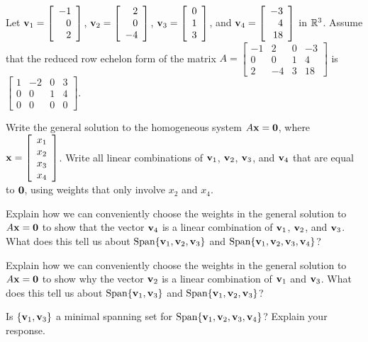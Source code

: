 \begin{activity} \label{act:1_f_4} Let $\mathbf{v}_1 = \left[ \begin{array}{r} -1 \\ 0 \\ 2 \end{array} \right]$, $\mathbf{v}_2 = \left[ \begin{array}{r} 2 \\ 0 \\ -4 \end{array} \right]$, $\mathbf{v}_3 = \left[ \begin{array}{c} 0 \\ 1 \\ 3 \end{array} \right]$, and $\mathbf{v}_4 = \left[ \begin{array}{r} -3 \\ 4 \\ 18 \end{array} \right]$ in $\mathbb{R}^3$. Assume that the reduced row echelon form of the matrix $A = \left[ \begin{array}{rrcr} -1&2&0&-3 \\ 0&0&1&4 \\ 2&-4&3&18 \end{array} \right]$ is $\left[ \begin{array}{crcc} 1&-2&0&3 \\ 0&0&1&4 \\ 0&0&0&0 \end{array} \right]$. 
	\ba
	\item Write the general solution to the homogeneous system $A \mathbf{x} = \mathbf{0}$, where $\mathbf{x} = \left[ \begin{array}{c} x_1 \\ x_2 \\ x_3 \\ x_4 \end{array} \right]$. Write all linear combinations of $\mathbf{v}_1$, $\mathbf{v}_2$, $\mathbf{v}_3$, and $\mathbf{v}_4$ that are equal to $\mathbf{0}$, using weights that only involve $x_2$ and $x_4$. 
	
	
	
	\item Explain how we can conveniently choose the weights in the general solution to $A \mathbf{x} = \mathbf{0}$ to show that the vector $\mathbf{v}_4$ is a linear combination of $\mathbf{v}_1$, $\mathbf{v}_2$, and $\mathbf{v}_3$. What does this tell us about $\text{Span} \{\mathbf{v}_1, \mathbf{v}_2, \mathbf{v}_3\}$ and $\text{Span} \{\mathbf{v}_1, \mathbf{v}_2, \mathbf{v}_3, \mathbf{v}_4\}$? 
	
	
	
	\item Explain how we can conveniently choose the weights in the general solution to $A \mathbf{x} = \mathbf{0}$ to show why the vector $\mathbf{v}_2$ is a linear combination of $\mathbf{v}_1$ and $\mathbf{v}_3$. What does this tell us about $\text{Span} \{\mathbf{v}_1, \mathbf{v}_3\}$ and $\text{Span} \{\mathbf{v}_1, \mathbf{v}_2, \mathbf{v}_3 \}$?
	
	
	
	\item Is $\{\mathbf{v}_1, \mathbf{v}_3\}$ a minimal spanning set for $\text{Span} \{\mathbf{v}_1, \mathbf{v}_2, \mathbf{v}_3, \mathbf{v}_4\}$? Explain your response. 
	
	
	
	
	\ea
\end{activity}
